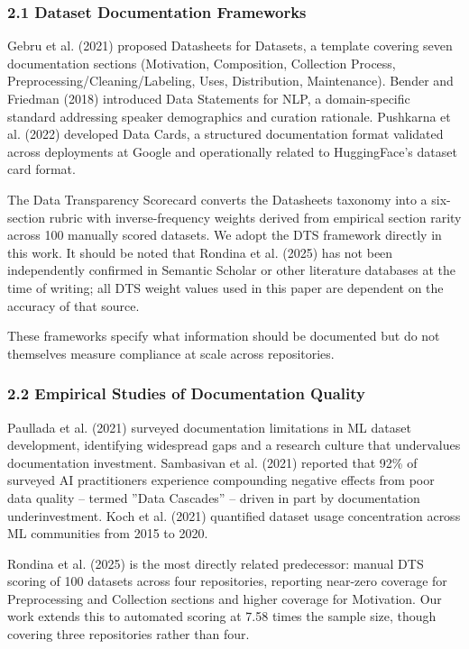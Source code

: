 
\subsubsection{2.1 Dataset Documentation Frameworks}

Gebru et al. (2021) proposed Datasheets for Datasets, a template covering seven documentation sections (Motivation, Composition, Collection Process, Preprocessing/Cleaning/Labeling, Uses, Distribution, Maintenance). Bender and Friedman (2018) introduced Data Statements for NLP, a domain-specific standard addressing speaker demographics and curation rationale. Pushkarna et al. (2022) developed Data Cards, a structured documentation format validated across deployments at Google and operationally related to HuggingFace's dataset card format.

The Data Transparency Scorecard \citep{Rondina2025DTS} converts the Datasheets taxonomy into a six-section rubric with inverse-frequency weights derived from empirical section rarity across 100 manually scored datasets. We adopt the DTS framework directly in this work. It should be noted that Rondina et al. (2025) has not been independently confirmed in Semantic Scholar or other literature databases at the time of writing; all DTS weight values used in this paper are dependent on the accuracy of that source.

These frameworks specify what information should be documented but do not themselves measure compliance at scale across repositories.

\subsubsection{2.2 Empirical Studies of Documentation Quality}

Paullada et al. (2021) surveyed documentation limitations in ML dataset development, identifying widespread gaps and a research culture that undervalues documentation investment. Sambasivan et al. (2021) reported that 92\% of surveyed AI practitioners experience compounding negative effects from poor data quality -- termed ''Data Cascades'' -- driven in part by documentation underinvestment. Koch et al. (2021) quantified dataset usage concentration across ML communities from 2015 to 2020.

Rondina et al. (2025) is the most directly related predecessor: manual DTS scoring of 100 datasets across four repositories, reporting near-zero coverage for Preprocessing and Collection sections and higher coverage for Motivation. Our work extends this to automated scoring at 7.58 times the sample size, though covering three repositories rather than four.

